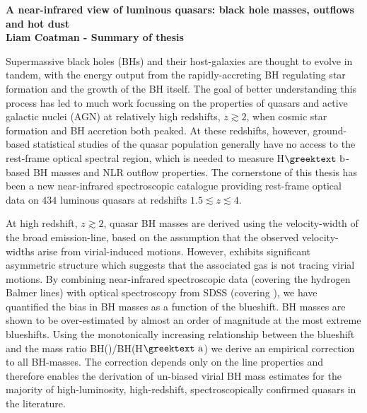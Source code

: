 \documentclass[a4paper,11pt]{article}
\newcommand\ion[2]{\text{#1\,\textsc{\lowercase{#2}}}}
\newcommand{\hans}{H$\textrm{\greektext a}$}
\newcommand{\hbns}{H$\textrm{\greektext b}$}
\begin{document}
\vspace*{-3cm}
\thispagestyle{plain}
\begin{center}
\textbf{\Large{A near-infrared view of luminous quasars: black hole masses, outflows and hot dust}}\\
\vspace{16pt}
\textbf{\large{Liam Coatman - Summary of thesis}}
\vspace{6pt}
\end{center}

Supermassive black holes (BHs) and their host-galaxies are thought to evolve in tandem, with the energy output from the rapidly-accreting BH regulating star formation and the growth of the BH itself. 
The goal of better understanding this process has led to much work focussing on the properties of quasars and active galactic nuclei (AGN) at relatively high redshifts, $z\gtrsim 2$, when cosmic star formation and BH accretion both peaked. 
At these redshifts, however, ground-based statistical studies of the quasar population generally have no access to the rest-frame optical spectral region, which is needed to measure \hbns-based BH masses and NLR outflow properties. 
The cornerstone of this thesis has been a new near-infrared spectroscopic catalogue providing rest-frame optical data on $434$ luminous quasars at redshifts $1.5 \lesssim z \lesssim 4$.

At high redshift, $z \gtrsim 2$, quasar BH masses are derived using the velocity-width of the \ion{C}{IV} broad emission-line, based on the assumption that the observed velocity-widths arise from virial-induced motions.  
However, \ion{C}{IV} exhibits significant asymmetric structure which suggests that the associated gas is not tracing virial motions. 
By combining near-infrared spectroscopic data (covering the hydrogen Balmer lines) with optical spectroscopy from SDSS (covering \ion{C}{IV}), we have quantified the bias in \ion{C}{IV} BH masses as a function of the \ion{C}{IV} blueshift. 
\ion{C}{IV} BH masses are shown to be over-estimated by almost an order of magnitude at the most extreme blueshifts.
Using the monotonically increasing relationship between the \ion{C}{IV} blueshift and the mass ratio BH(\ion{C}{IV})/BH(\hans) we derive an empirical correction to all \ion{C}{IV} BH-masses.
The correction depends only on the \ion{C}{IV} line properties and therefore enables the derivation of un-biased virial BH mass estimates for the majority of high-luminosity, high-redshift, spectroscopically confirmed quasars in the literature. 
\end{document}
